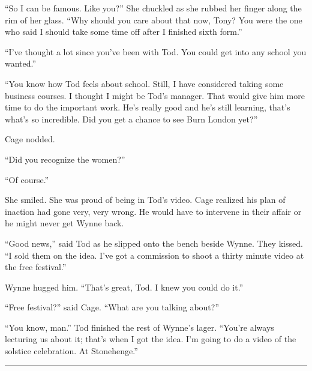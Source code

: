 ``So I can be famous. Like you?'' She chuckled as she rubbed her finger along the rim of her glass. ``Why should you care about that now, Tony? You were the one who said I should take some time off after I finished sixth form.''

``I've thought a lot since you've been with Tod. You could get into any school you wanted.''

``You know how Tod feels about school. Still, I have considered taking some business courses. I thought I might be Tod's manager. That would give him more time to do the important work. He's really good and he's still learning, that's what's so incredible. Did you get a chance to see Burn London yet?''

Cage nodded.

``Did you recognize the women?''

``Of course.''

She smiled. She was proud of being in Tod's video. Cage realized his plan of inaction had gone very, very wrong. He would have to intervene in their affair or he might never get Wynne back.

``Good news,'' said Tod as he slipped onto the bench beside Wynne. They kissed. ``I sold them on the idea. I've got a commission to shoot a thirty minute video at the free festival.''

Wynne hugged him. ``That's great, Tod. I knew you could do it.''

``Free festival?'' said Cage. ``What are you talking about?''

``You know, man.'' Tod finished the rest of Wynne's lager. ``You're always lecturing us about it; that's when I got the idea. I'm going to do a video of the solstice celebration. At Stonehenge.''

\fancybreak{* * *}

